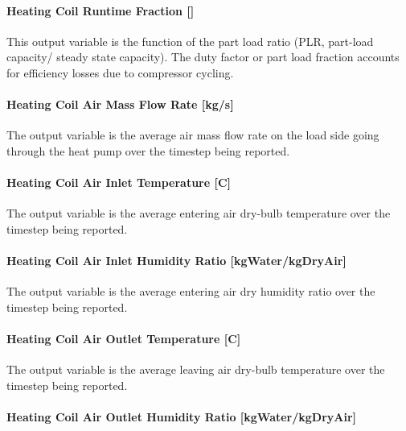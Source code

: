 \paragraph{Heating Coil Runtime Fraction {[]}}\label{heating-coil-runtime-fraction-6}

This output variable is the function of the part load ratio (PLR, part-load capacity/ steady state capacity). The duty factor or part load fraction accounts for efficiency losses due to compressor cycling.

\paragraph{Heating Coil Air Mass Flow Rate {[}kg/s{]}}\label{heating-coil-air-mass-flow-rate-kgs}

The output variable is the average air mass flow rate on the load side going through the heat pump over the timestep being reported.

\paragraph{Heating Coil Air Inlet Temperature {[}C{]}}\label{heating-coil-air-inlet-temperature-c}

The output variable is the average entering air dry-bulb temperature over the timestep being reported.

\paragraph{Heating Coil Air Inlet Humidity Ratio {[}kgWater/kgDryAir{]}}\label{heating-coil-air-inlet-humidity-ratio-kgwaterkgdryair}

The output variable is the average entering air dry humidity ratio over the timestep being reported.

\paragraph{Heating Coil Air Outlet Temperature {[}C{]}}\label{heating-coil-air-outlet-temperature-c}

The output variable is the average leaving air dry-bulb temperature over the timestep being reported.

\paragraph{Heating Coil Air Outlet Humidity Ratio {[}kgWater/kgDryAir{]}}\label{heating-coil-air-outlet-humidity-ratio-kgwaterkgdryair}

